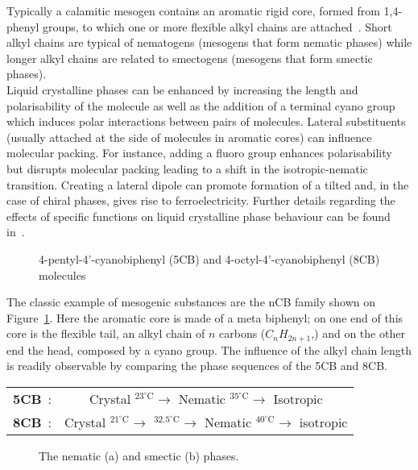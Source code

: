Typically a calamitic mesogen contains an aromatic rigid core, formed from 1,4-phenyl groups, to
which one or more flexible alkyl chains are attached~\cite{introSoftMatter}. Short alkyl chains are 
typical of nematogens (mesogens that form nematic phases) while longer alkyl chains are related to
smectogens (mesogens that form smectic phases).\\
Liquid crystalline phases can be enhanced by increasing the length and polarisability of the
molecule as well as the addition of a terminal cyano group which induces polar interactions between
pairs of molecules. Lateral substituents (usually attached at the side of molecules in aromatic
cores) can influence molecular packing. For instance, adding a fluoro group enhances
polarisability but disrupts molecular packing leading to a shift in the
isotropic-nematic transition. Creating a lateral dipole can promote formation of a tilted \smC
and, in the case of chiral phases, gives rise to ferroelectricity. Further details regarding the 
effects of specific functions on liquid crystalline phase behaviour can be found in~\cite{greenBook}.

\picW=7cm
\begin{figure}
	\centering
	\caption{4-pentyl-4'-cyanobiphenyl (5CB) and 4-octyl-4'-cyanobiphenyl (8CB) molecules}
	\label{fig:nCB}
\end{figure}

The classic example of mesogenic substances are the nCB family shown on Figure~\ref{fig:nCB}. 
Here the aromatic core is made of a meta biphenyl; on one end of this core is the flexible tail, 
an alkyl chain of $n$ carbons ($C_nH_{2n+1}$,) and on the other end the head, composed by a 
cyano group. The influence of the alkyl chain length is readily observable by comparing the 
phase sequences of the 5CB and 8CB.

\begin{center}
\begin{tabular}{cc}
\textbf{5CB}~:  &Crystal $^{23^\circ\mathrm{C}}\rightarrow$ 
		Nematic $^{35^\circ\mathrm{C}}\rightarrow$  Isotropic\\


\textbf{8CB}~:	&Crystal $^{21^\circ\mathrm{C}}\rightarrow$ 
		\SmA $^{32.5^\circ\mathrm{C}}\rightarrow$ 
		Nematic $^{40^\circ\mathrm{C}}\rightarrow$  
		isotropic
\end{tabular}
\end{center}

\picW=6cm
\begin{figure}
	\centering
	\hspace*{10mm}
	\caption{The nematic (a) and smectic (b) phases.}
	\label{fig:N_Sm}
\end{figure}


